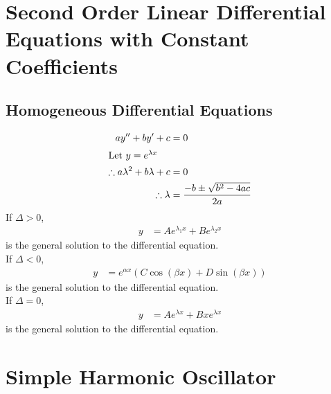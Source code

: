 \documentclass[fleqn, a4paper, 12pt]{article}
\theoremstyle{definition}
\theoremstyle{theorem}
\begin{document}
\section{Second Order Linear Differential Equations with Constant Coefficients}

\subsection{Homogeneous Differential Equations}

\begin{align*}
	a y'' + b y' + c &= 0\\
	\intertext{Let $y = e^{\lambda x}$}
	\therefore a \lambda^2 + b \lambda + c &= 0\\
	\therefore \lambda &= \dfrac{-b \pm \sqrt{b^2 - 4 a c}}{2 a}
\end{align*}
If $\Delta > 0$,
\begin{align*}
	y &= A e^{\lambda_1 x} + B e^{\lambda_2 x}
\end{align*}
is the general solution to the differential equation.\\
If $\Delta < 0$,
\begin{align*}
	y &= e^{\alpha x} \left( C \cos (\beta x) + D \sin (\beta x) \right)
\end{align*}
is the general solution to the differential equation.\\
If $\Delta = 0$,
\begin{align*}
	y &= A e^{\lambda x} + B x e^{\lambda  x}
\end{align*}
is the general solution to the differential equation.

\section{Simple Harmonic Oscillator}
\end{document}
